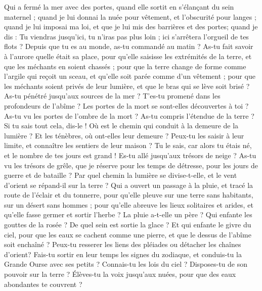 \begin{multicols}{2}
Qui a fermé la mer avec des portes, quand elle sortit en s'élançant du sein maternel ;
quand je lui donnai la nuée pour vêtement, et l'obscurité pour langes ;
quand je lui imposai ma loi, et que je lui mis des barrières et des portes;
quand je dis : Tu viendras jusqu'ici, tu n'iras pas plus loin ; ici s'arrêtera l'orgueil de tes flots ?
Depuis que tu es au monde, as-tu commandé au matin ? As-tu fait savoir à l'aurore quelle était sa place,
pour qu'elle saisisse les extrémités de la terre, et que les méchants en soient chassés ;
pour que la terre change de forme comme l'argile qui reçoit un sceau, et qu'elle soit parée comme d'un vêtement ;
pour que les méchants soient privés de leur lumière, et que le bras qui se lève soit brisé ?
As-tu pénétré jusqu'aux sources de la mer ? T'es-tu promené dans les profondeurs de l'abîme ?
Les portes de la mort se sont-elles découvertes à toi ? As-tu vu les portes de l'ombre de la mort ?
As-tu compris l'étendue de la terre ? Si tu sais tout cela, dis-le !
Où est le chemin qui conduit à la demeure de la lumière ? Et les ténèbres, où ont-elles leur demeure ?
Peux-tu les saisir à leur limite, et connaître les sentiers de leur maison ?
Tu le sais, car alors tu étais né, et le nombre de tes jours est grand !
Es-tu allé jusqu'aux trésors de neige ? As-tu vu les trésors de grêle,
que je réserve pour les temps de détresse, pour les jours de guerre et de bataille ?
Par quel chemin la lumière se divise-t-elle, et le vent d'orient se répand-il sur la terre ?
Qui a ouvert un passage à la pluie, et tracé la route de l'éclair et du tonnerre,
pour qu'elle pleuve sur une terre sans habitants, sur un désert sans hommes ;
pour qu'elle abreuve les lieux solitaires et arides, et qu'elle fasse germer et sortir l'herbe ?
La pluie a-t-elle un père ? Qui enfante les gouttes de la rosée ?
De quel sein est sortie la glace ? Et qui enfante le givre du ciel,
pour que les eaux se cachent comme une pierre, et que le dessus de l'abîme soit enchaîné ?
Peux-tu resserer les liens des pléiades ou détacher les chaînes d'orient?
Fais-tu sortir en leur temps les signes du zodiaque, et conduis-tu la Grande Ourse avec ses petits ?
Connais-tu les lois du ciel ? Disposes-tu de son pouvoir sur la terre ?
Élèves-tu la voix jusqu'aux nuées, pour que des eaux abondantes te couvrent ?

\end{multicols}
